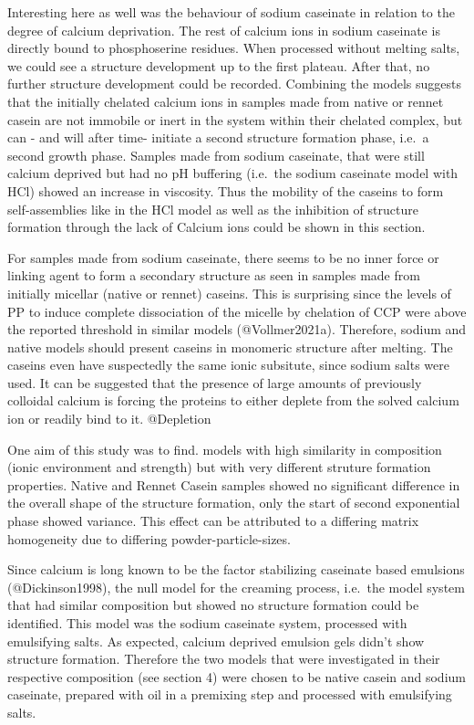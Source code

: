 \documentclass[
]{article}
\begin{document}
Interesting here as well was the behaviour of sodium caseinate in
relation to the degree of calcium deprivation. The rest of calcium ions
in sodium caseinate is directly bound to phosphoserine residues. When
processed without melting salts, we could see a structure development up
to the first plateau. After that, no further structure development could
be recorded. Combining the models suggests that the initially chelated
calcium ions in samples made from native or rennet casein are not
immobile or inert in the system within their chelated complex, but can -
and will after time- initiate a second structure formation phase, i.e.~a
second growth phase. Samples made from sodium caseinate, that were still
calcium deprived but had no pH buffering (i.e.~the sodium caseinate
model with HCl) showed an increase in viscosity. Thus the mobility of
the caseins to form self-assemblies like in the HCl model as well as the
inhibition of structure formation through the lack of Calcium ions could
be shown in this section.

For samples made from sodium caseinate, there seems to be no inner force
or linking agent to form a secondary structure as seen in samples made
from initially micellar (native or rennet) caseins. This is surprising
since the levels of PP to induce complete dissociation of the micelle by
chelation of CCP were above the reported threshold in similar models
(@Vollmer2021a). Therefore, sodium and native models should present
caseins in monomeric structure after melting. The caseins even have
suspectedly the same ionic subsitute, since sodium salts were used. It
can be suggested that the presence of large amounts of previously
colloidal calcium is forcing the proteins to either deplete from the
solved calcium ion or readily bind to it. @Depletion

One aim of this study was to find. models with high similarity in
composition (ionic environment and strength) but with very different
struture formation properties. Native and Rennet Casein samples showed
no significant difference in the overall shape of the structure
formation, only the start of second exponential phase showed variance.
This effect can be attributed to a differing matrix homogeneity due to
differing powder-particle-sizes.

Since calcium is long known to be the factor stabilizing caseinate based
emulsions (@Dickinson1998), the null model for the creaming process,
i.e.~the model system that had similar composition but showed no
structure formation could be identified. This model was the sodium
caseinate system, processed with emulsifying salts. As expected, calcium
deprived emulsion gels didn't show structure formation. Therefore the
two models that were investigated in their respective composition (see
section 4) were chosen to be native casein and sodium caseinate,
prepared with oil in a premixing step and processed with emulsifying
salts.
\end{document}
